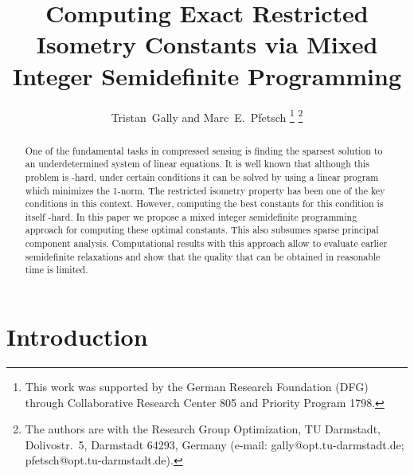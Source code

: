 \documentclass[journal]{IEEEtran}
\newcommand{\NP}{\text{NP}}
\begin{document}
\title{Computing Exact Restricted Isometry Constants via Mixed Integer Semidefinite Programming}
\author{Tristan~Gally and Marc~E.~Pfetsch
  \thanks{This work was supported by the German Research Foundation (DFG) through Collaborative Research Center 805 and Priority Program 1798.}
  \thanks{The  authors  are  with  the  Research  Group  Optimization,  TU
    Darmstadt, Dolivostr.\ 5,
  Darmstadt  64293,  Germany  (e-mail:  gally@opt.tu-darmstadt.de;
  pfetsch@opt.tu-darmstadt.de).}}


\maketitle

\noindent
\begin{abstract}
  One of the fundamental tasks in compressed sensing is finding the
  sparsest solution to an underdetermined system of linear equations. It is
  well known that although this problem is \NP-hard, under certain
  conditions it can be solved by using a linear program which minimizes the
  1-norm. The restricted isometry property has been one of the key
  conditions in this context. However, computing the best constants for
  this condition is itself \NP-hard. In this paper we propose a
  mixed integer semidefinite programming approach for computing these
  optimal constants. This also subsumes sparse principal component
  analysis. Computational results with this approach allow to evaluate
  earlier semidefinite relaxations and show that the quality that can be
  obtained in reasonable time is limited.
\end{abstract}

\section{Introduction}
\end{document}
